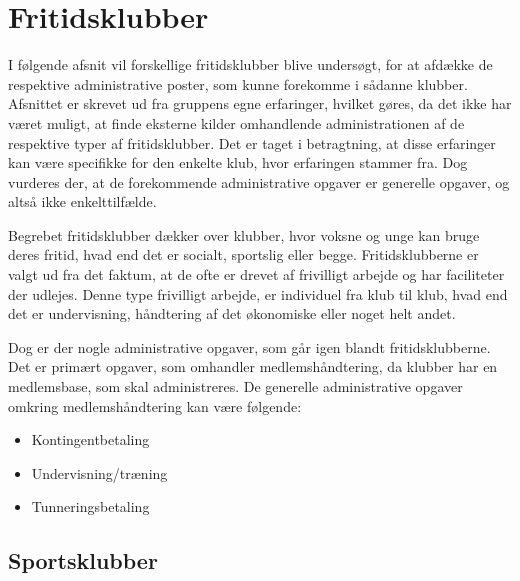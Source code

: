 \chapter{Fritidsklubber} \label{chap:Fritidsklubber}

I følgende afsnit vil forskellige fritidsklubber blive undersøgt, for at afdække de respektive administrative poster, som kunne forekomme i sådanne klubber. 
Afsnittet er skrevet ud fra gruppens egne erfaringer, hvilket gøres, da det ikke har været muligt, at finde eksterne kilder omhandlende administrationen af de respektive typer af fritidsklubber. 
Det er taget i betragtning, at disse erfaringer kan være specifikke for den enkelte klub, hvor erfaringen stammer fra. 
Dog vurderes der, at de forekommende administrative opgaver er generelle opgaver, og altså ikke enkelttilfælde. 

Begrebet fritidsklubber dækker over klubber, hvor voksne og unge kan bruge deres fritid, hvad end det er socialt, sportslig eller begge. 
Fritidsklubberne er valgt ud fra det faktum, at de ofte er drevet af frivilligt arbejde og har faciliteter der udlejes. 
Denne type frivilligt arbejde, er individuel fra klub til klub, hvad end det er undervisning, håndtering af det økonomiske eller noget helt andet. 

Dog er der nogle administrative opgaver, som går igen blandt fritidsklubberne.
Det er primært opgaver, som omhandler medlemshåndtering, da klubber har en medlemsbase, som skal administreres. 
De generelle administrative opgaver omkring medlemshåndtering kan være følgende:
\begin{itemize}
	\item Kontingentbetaling
	\item Undervisning/træning
	\item Tunneringsbetaling
\end{itemize}


\section{Sportsklubber} \label{Sportsklubber}

